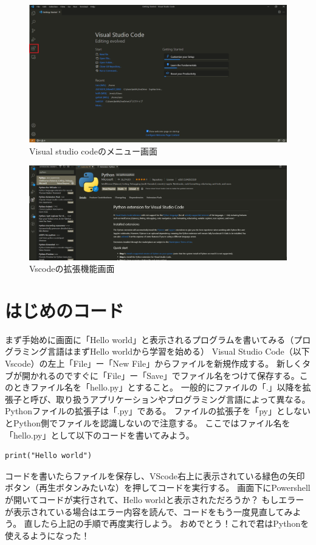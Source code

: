 \documentclass[]{article}
\begin{document}
	\begin{figure}
		\centering
		\includegraphics[width=0.9\linewidth]{figs/vscode1.png}
		\caption{Visual studio codeのメニュー画面}
		\label{fig:1}
	\end{figure}

	\begin{figure}
		\centering
		\includegraphics[width=0.9\linewidth]{figs/vscode2.png}
		\caption{Vscodeの拡張機能画面}
		\label{fig:vscode-extension}
	\end{figure}

	\section{はじめのコード}
	まず手始めに画面に「Hello world」と表示されるプログラムを書いてみる（プログラミング言語はまずHello worldから学習を始める）
	Visual Studio Code（以下Vscode）の左上「File」ー「New File」からファイルを新規作成する。
	新しくタブが開かれるのですぐに「File」ー「Save」でファイル名をつけて保存する。このときファイル名を「hello.py」とすること。
	一般的にファイルの「.」以降を拡張子と呼び、取り扱うアプリケーションやプログラミング言語によって異なる。
	Pythonファイルの拡張子は「.py」である。
	ファイルの拡張子を「py」としないとPython側でファイルを認識しないので注意する。
	ここではファイル名を「hello.py」として以下のコードを書いてみよう。

	\begin{lstlisting}[caption=hello.py,label=fuga]
		print("Hello world")
	\end{lstlisting}
	コードを書いたらファイルを保存し、VScode右上に表示されている緑色の矢印ボタン（再生ボタンみたいな）を押してコードを実行する。
	画面下にPowershellが開いてコードが実行されて、Hello worldと表示されただろうか？
	もしエラーが表示されている場合はエラー内容を読んで、コードをもう一度見直してみよう。
	直したら上記の手順で再度実行しよう。
	おめでとう！これで君はPythonを使えるようになった！
\end{document}
